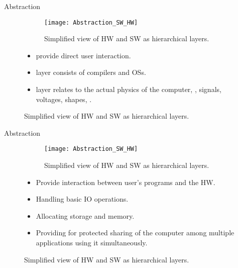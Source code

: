 \begin{frame}{Abstraction}
\vspace{-5pt}
\begin{figure}[!htb]
  \centering
  \begin{minipage}{.49\linewidth}
      \begin{figure}
        \centering
        \texttt{[image: Abstraction\_SW\_HW]}
        \label{Figure:abstraction_sw_hw}
        \caption{Simplified view of \ac{HW} and \ac{SW} as hierarchical layers.}
      \end{figure}
  \end{minipage}
  \begin{minipage}{.49\linewidth}
      \begin{itemize}
      \item {} provide direct user interaction.
      \item {} layer consists of compilers and \acp{OS}.
      \item {} layer relates to the actual physics of the computer, \ie, signals, voltages, shapes, \etc.
      \end{itemize}
  \end{minipage}
\end{figure}
\end{frame}

\setcounter{figure}{0}
\begin{frame}{Abstraction}
\vspace{-5pt}
\begin{figure}[!htb]
  \centering
  \begin{minipage}{.49\linewidth}
      \begin{figure}
        \centering
        \texttt{[image: Abstraction\_SW\_HW]}
        \label{Figure:abstraction_sw_hw}
        \caption{Simplified view of \ac{HW} and \ac{SW} as hierarchical layers.}
      \end{figure}
  \end{minipage}
  \begin{minipage}{.49\linewidth}
      \begin{itemize}
        \item Provide interaction between user's programs and the \ac{HW}.
        \item Handling basic \ac{IO} operations.
        \item Allocating storage and memory.
        \item Providing for protected sharing of the computer among multiple applications using it simultaneously.
      \end{itemize}
  \end{minipage}
\end{figure}
\end{frame}

